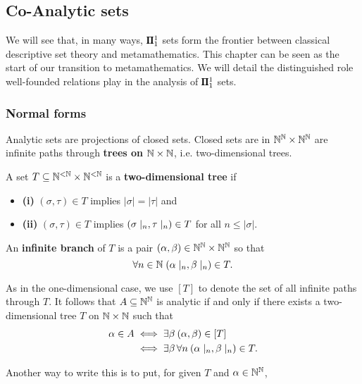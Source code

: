 \subsection{Co-Analytic sets}

We will see that, in many ways, $\pmb{\Pi}^1_{1}$ sets form the frontier between classical descriptive set theory and metamathematics. This chapter can be seen as the start of our transition to metamathematics. We will detail the distinguished role well-founded relations play in the analysis of $\pmb{\Pi}^1_{1}$ sets.

\subsubsection{Normal forms}

Analytic sets are projections of closed sets. Closed sets are in $\mathbb{N}^{\mathbb{N}}\times \mathbb{N}^{\mathbb{N}}$ are infinite paths through \textbf{trees on $\mathbb{N} \times \mathbb{N}$}, i.e. two-dimensional trees.

\begin{definition}\label{def-two-dim-tree}A set $T \subseteq \mathbb{N}^{<\mathbb{N}} \times \mathbb{N}^{<\mathbb{N}}$  is a \textbf{two-dimensional tree} if

\begin{itemize}
\item \textbf{(i)} $(\sigma,\tau) \in T$ implies $|\sigma|=|\tau|$ and
\item \textbf{(ii)} $(\sigma,\tau) \in T$ implies $(\sigma\mid_{n},\tau\mid_{n}) \in T$ for all $n \leq |\sigma|$.
\end{itemize}

An \textbf{infinite branch} of $T$ is a pair $(\alpha,\beta) \in \mathbb{N}^{\mathbb{N}}\times \mathbb{N}^{\mathbb{N}}$ so that
\begin{equation*}
\forall n\in \mathbb{N} \; (\alpha\mid_{n},\beta\mid_{n}) \in T.
\end{equation*}
\end{definition}As in the one-dimensional case, we use $[T]$ to denote the set of all infinite paths through $T$. It follows that $A \subseteq \mathbb{N}^{\mathbb{N}}$ is analytic if and only if there exists a two-dimensional tree $T$ on $\mathbb{N} \times \mathbb{N}$ such that
\begin{align*}
	\alpha \in A & \iff  \exists \beta \: (\alpha,\beta) \in [T]\\
	             & \iff  \exists \beta \, \forall n \: (\alpha\mid_{n},\beta\mid_{n}) \in T.
\end{align*}

Another way to write this is to put, for given $T$ and $\alpha \in \mathbb{N}^{\mathbb{N}}$,

